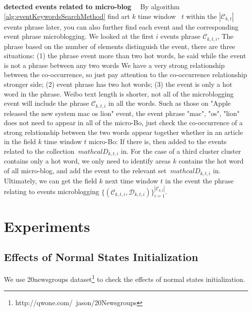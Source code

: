 \documentclass[conference,compsoc]{IEEEtran}
\begin{document}
\textbf{detected events related to micro-blog}
\ \
By algorithm \ref{alg:eventKeywordsSearchMethod} find art \(k \) time window \ \(t \) within the \(| \mathcal{C}_{k, t} | \) events phrase later, you can also further find each event and the corresponding event phrase microblogging.
We looked at the first \(i \) events phrase \(\mathcal{C}_{k, t, i} \),
The phrase based on the number of elements distinguish the event, there are three situations: (1) the phrase event more than two hot words, he said while the event is not a phrase between any two words We have a very strong relationship between the co-occurrence, so just pay attention to the co-occurrence relationship stronger side; (2) event phrase has two hot words; (3) the event is only a hot word in the phrase.
Weibo text length is shorter, not all of the microblogging event will include the phrase \(\mathcal{C}_{k, t, i} \) in all the words.
Such as those on "Apple released the new system mac os lion" event, the event phrase "mac", "os", "lion" does not need to appear in all of the micro-Bo, just check the co-occurrence of a strong relationship between the two words appear together whether in an article in the field \(k \) time window \(t \) micro-Bo: If there is, then added to the events related to the collection \(\ mathcal {D} _ {k, t, i} \) in.
For the case of a third cluster cluster contains only a hot word, we only need to identify areas \(k \) contains the hot word of all micro-blog, and add the event to the relevant set \(\ mathcal{D }_{k, t, i} \) in.
Ultimately, we can get the field \(k \) next time window \(t \) in the event the phrase relating to events microblogging \(\{(\mathcal{C}_{k, t, i}, \mathcal{D}_{k, t, i}) \}_{i=1}^{| \mathcal{C}_{k, t} |} \).

\section{Experiments}
\subsection{Effects of Normal States Initialization}
We use 20newsgroups\cite{lang1995newsweeder} dataset\footnote{http://qwone.com/~jason/20Newsgroups} to check the effects of normal states initialization.
\end{document}
